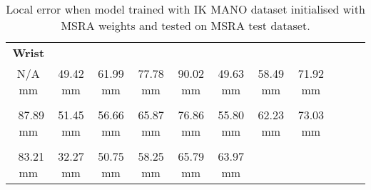     \begin{table}[!ht]
    \begin{tabular}{|c|c|c|c|c|c|c|c|c|c|c|}
    \hline
    {\bfseries Wrist} & \cellcolor[HTML]{ffff00}{\bfseries IMCP} & \cellcolor[HTML]{ff8000}{\bfseries IPIP} & \cellcolor[HTML]{ff7500}{\bfseries IDIP} & \cellcolor[HTML]{ff0000}{\bfseries ITIP} & \cellcolor[HTML]{ffff00}{\bfseries MMCP} & \cellcolor[HTML]{ffbf00}{\bfseries MPIP} & \cellcolor[HTML]{ff7500}{\bfseries MDIP}  \\
    N/A mm & \cellcolor[HTML]{ffff00}$\,\,\,$49.42 mm & \cellcolor[HTML]{ff8000}$\,\,\,$61.99 mm & \cellcolor[HTML]{ff7500}$\,\,\,$77.78 mm & \cellcolor[HTML]{ff0000}$\,\,\,$90.02 mm & \cellcolor[HTML]{ffff00}$\,\,\,$49.63 mm & \cellcolor[HTML]{ffbf00}$\,\,\,$58.49 mm & \cellcolor[HTML]{ff7500}$\,\,\,$71.92 mm\\
    \hline
    \cellcolor[HTML]{ff2500}{\bfseries MTIP} & \cellcolor[HTML]{ffbf00}{\bfseries RMCP} & \cellcolor[HTML]{ffbf00}{\bfseries RPIP} & \cellcolor[HTML]{ff8000}{\bfseries RDIP} & \cellcolor[HTML]{ff7500}{\bfseries RTIP} & \cellcolor[HTML]{ffbf00}{\bfseries PMCP} & \cellcolor[HTML]{ff8000}{\bfseries PPIP} & \cellcolor[HTML]{ff7500}{\bfseries PDIP}  \\
    \cellcolor[HTML]{ff2500}$\,\,\,$87.89 mm & \cellcolor[HTML]{ffbf00}$\,\,\,$51.45 mm & \cellcolor[HTML]{ffbf00}$\,\,\,$56.66 mm & \cellcolor[HTML]{ff8000}$\,\,\,$65.87 mm & \cellcolor[HTML]{ff7500}$\,\,\,$76.86 mm & \cellcolor[HTML]{ffbf00}$\,\,\,$55.80 mm & \cellcolor[HTML]{ff8000}$\,\,\,$62.23 mm & \cellcolor[HTML]{ff7500}$\,\,\,$73.03 mm\\
    \hline
    \cellcolor[HTML]{ff2500}{\bfseries PTIP} & \cellcolor[HTML]{bfff00}{\bfseries TMCP} & \cellcolor[HTML]{ffbf00}{\bfseries TPIP} & \cellcolor[HTML]{ffbf00}{\bfseries PDIP} & \cellcolor[HTML]{ff8000}{\bfseries TTIP} & \cellcolor[HTML]{ff8000}{\bfseries Average}  \\
    \cellcolor[HTML]{ff2500}$\,\,\,$83.21 mm & \cellcolor[HTML]{bfff00}$\,\,\,$32.27 mm & \cellcolor[HTML]{ffbf00}$\,\,\,$50.75 mm & \cellcolor[HTML]{ffbf00}$\,\,\,$58.25 mm & \cellcolor[HTML]{ff8000}$\,\,\,$65.79 mm & \cellcolor[HTML]{ff8000}$\,\,\,$63.97 mm \\
    \cline{1-6}
    \end{tabular}
    \caption{Local error when model trained with IK MANO dataset initialised with MSRA weights and tested on MSRA test dataset.}
    \label{tb:amal}
    \end{table}